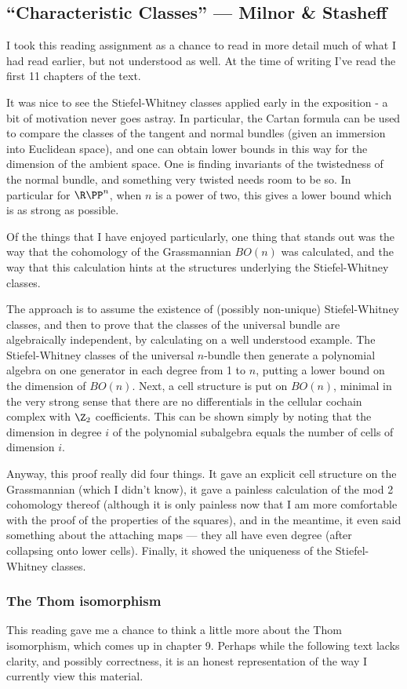 \documentclass[11pt]{article}
\newcommand{\KanSemResponse}[1]
{
\thispagestyle{fancy}
\section{#1}
}
\begin{document}
\begin{CharacteristicClasses}
\KanSemResponse
{``Characteristic Classes'' --- Milnor \& Stasheff}
I took this reading assignment as a chance to read in more detail much of what I had read earlier, but not understood as well. At the time of writing I've read the first 11 chapters of the text.

It was nice to see the Stiefel-Whitney classes applied early in the exposition - a bit of motivation never goes astray. In particular, the Cartan formula can be used to compare the classes of the tangent and normal bundles (given an immersion into Euclidean space), and one can obtain lower bounds in this way for the dimension of the ambient space. One is finding invariants of the twistedness of the normal bundle, and something very twisted needs room to be so. In particular for $\RP^n$, when $n$ is a power of two, this gives a lower bound which is as strong as possible.

Of the things that I have enjoyed particularly, one thing that stands out was the way that the cohomology of the Grassmannian $BO(n)$ was calculated, and the way that this calculation hints at the structures underlying the Stiefel-Whitney classes.

The approach is to assume the existence of (possibly non-unique) Stiefel-Whitney classes, and then to prove that the classes of the universal bundle are algebraically independent, by calculating on a well understood example. The Stiefel-Whitney classes of the universal $n$-bundle then generate a polynomial algebra on one generator in each degree from 1 to $n$, putting a lower bound on the dimension of $BO(n)$. Next, a cell structure is put on $BO(n)$, minimal in the very strong sense that there are no differentials in the cellular cochain complex with $\Z_2$ coefficients. This can be shown simply by noting that the dimension in degree $i$ of the polynomial subalgebra equals the number of cells of dimension $i$.

Anyway, this proof really did four things. It gave an explicit cell structure on the Grassmannian (which I didn't know), it gave a painless calculation of the mod 2 cohomology thereof (although it is only painless now that I am more comfortable with the proof of the properties of the squares), and in the meantime, it even said something about the attaching maps --- they all have even degree (after collapsing onto lower cells). Finally, it showed the uniqueness of the Stiefel-Whitney classes.

\subsubsection*{The Thom isomorphism}
This reading gave me a chance to think a little more about the Thom isomorphism, which comes up in chapter 9. Perhaps while the following text lacks clarity, and possibly correctness, it is an honest representation of the way I currently view this material.


\end{CharacteristicClasses}
\end{document}
